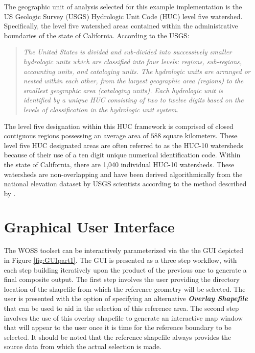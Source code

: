 The geographic unit of analysis selected for this example implementation is the US Geologic Survey (USGS) Hydrologic Unit Code (HUC) level five watershed. Specifically, the level five watershed areas contained within the administrative boundaries of the state of California. According to the USGS:

    \blockquote{\textit{The United States is divided and sub-divided into successively smaller hydrologic units which are classified into four levels: regions, sub-regions, accounting units, and cataloging units. The hydrologic units are arranged or nested within each other, from the largest geographic area (regions) to the smallest geographic area (cataloging units). Each hydrologic unit is identified by a unique HUC consisting of two to twelve digits based on the levels of classification in the hydrologic unit system. \cite{Seaber1987}}}
    
The level five designation within this HUC framework is comprised of closed contiguous regions possessing an average area of $588$ square kilometers. These level five HUC designated areas are often referred to as the HUC-10 watersheds because of their use of a ten digit unique numerical identification code. Within the state of California, there are 1,040 individual HUC-10 watersheds. These watersheds are non-overlapping and have been derived algorithmically from the national elevation dataset by USGS scientists according to the method described by \cite{Seaber1987}.
    
\section{Graphical User Interface}
   
The WOSS toolset can be interactively parameterized via the the GUI depicted in Figure \ref{fig:GUIpart1}. The GUI is presented as a three step workflow, with each step building iteratively upon the product of the previous one to generate a final composite output. The first step involves the user providing the directory location of the shapefile from which the reference geometry will be selected. The user is presented with the option of specifying an alternative \textit{\textbf{Overlay Shapefile}} that can be used to aid in the selection of this reference area. The second step involves the use of this overlay shapefile to generate an interactive map window that will appear to the user once it is time for the reference boundary to be selected. It should be noted that the reference shapefile always provides the source data from which the actual selection is made. 


